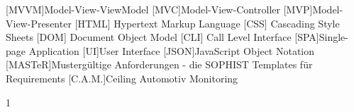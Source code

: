






\begin{spacing}{1} %
	\frontmatter
	
	
	
	\tableofcontents
	\listoffigures
	\listoftables
	\newpage
	\begin{acronym}
	[MVVM]{Model-View-ViewModel}
	[MVC]{Model-View-Controller}
	[MVP]{Model-View-Presenter}
	 [HTML] {Hypertext Markup Language}
	 [CSS] {Cascading Style Sheets}
	 [DOM] {Document Object Model}
	 [CLI] {Call Level Interface}
	[SPA]{Single-page Application}
	[UI]{User Interface}
	[JSON]{JavaScript Object Notation}
	[MASTeR]{Musterg\"ultige Anforderungen - die SOPHIST Templates f\"ur Requirements}
	[C.A.M.]{Ceiling Automotiv Monitoring}
	\end{acronym}
\end{spacing}{1}
\mainmatter
{}










%


